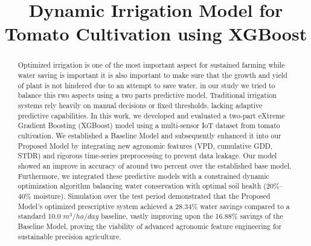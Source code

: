 \documentclass[conference]{IEEEtran}
\begin{document}
\title{Dynamic Irrigation Model for Tomato Cultivation using XGBoost\\
}

\author{
\and
{}
\and
{}
}

\maketitle

\begin{abstract}
Optimized irrigation is one of the most important aspect for sustained farming while water saving is important it is also important to make sure that the growth and yield of plant is not hindered due to an attempt to save water, in our study we tried to balance this rwo aspects using a two parts predictive model. Traditional irrigation systems rely heavily on manual decisions or fixed thresholds, lacking adaptive predictive capabilities. In this work, we developed and evaluated a two-part eXtreme Gradient Boosting (XGBoost) model using a multi-sensor IoT dataset from tomato cultivation. We established a Baseline Model and subsequently enhanced it into our Proposed Model by integrating new agronomic features (VPD, cumulative GDD, STDR) and rigorous time-series preprocessing to prevent data leakage. Our model showed an improve in accuracy of around two percent over the established base model. Furthermore, we integrated these predictive models with a constrained dynamic optimization algorithm balancing water conservation with optimal soil health (20\%--40\% moisture). Simulation over the test period demonstrated that the Proposed Model's optimized prescriptive system achieved a 28.34\% water savings compared to a standard 10.0 $m^{3}/ha/day$ baseline, vastly improving upon the 16.88\% savings of the Baseline Model, proving the viability of advanced agronomic feature engineering for sustainable precision agriculture.
\end{abstract}
\end{document}
